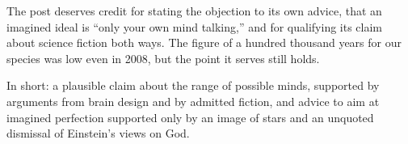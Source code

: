 \begin{afterword}
The post deserves credit for stating the objection to its own advice, that an imagined ideal is ``only your own mind talking,'' and for qualifying its claim about science fiction both ways. The figure of a hundred thousand years for our species was low even in 2008, but the point it serves still holds.

In short: a plausible claim about the range of possible minds, supported by arguments from brain design and by admitted fiction, and advice to aim at imagined perfection supported only by an image of stars and an unquoted dismissal of Einstein's views on God.
\end{afterword}
